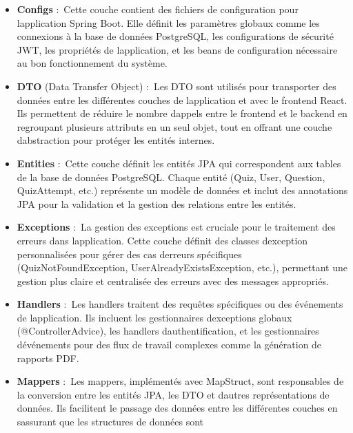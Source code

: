 \documentclass[12pt,a4paper,twoside]{report}
\begin{document}
\begin{itemize}
\item
  \textbf{Configs} :~Cette couche contient des fichiers de configuration
  pour l\textquotesingle application Spring Boot. Elle définit les
  paramètres globaux comme les connexions à la base de données
  PostgreSQL, les configurations de sécurité JWT, les propriétés de
  l\textquotesingle application, et les beans de configuration
  nécessaire au bon fonctionnement du système.
\item
  \textbf{DTO} (Data Transfer Object) :~Les DTO sont utilisés pour
  transporter des données entre les différentes couches de
  l\textquotesingle application et avec le frontend React. Ils
  permettent de réduire le nombre d\textquotesingle appels entre le
  frontend et le backend en regroupant plusieurs attributs en un seul
  objet, tout en offrant une couche d\textquotesingle abstraction pour
  protéger les entités internes.
\item
  \textbf{Entities} :~Cette couche définit les entités JPA qui
  correspondent aux tables de la base de données PostgreSQL. Chaque
  entité (Quiz, User, Question, QuizAttempt, etc.) représente un modèle
  de données et inclut des annotations JPA pour la validation et la
  gestion des relations entre les entités.
\item
  \textbf{Exceptions} :~La gestion des exceptions est cruciale pour le
  traitement des erreurs dans l\textquotesingle application. Cette
  couche définit des classes d\textquotesingle exception personnalisées
  pour gérer des cas d\textquotesingle erreurs spécifiques
  (QuizNotFoundException, UserAlreadyExistsException, etc.), permettant
  une gestion plus claire et centralisée des erreurs avec des messages
  appropriés.
\item
  \textbf{Handlers} :~Les handlers traitent des requêtes spécifiques ou
  des événements de l\textquotesingle application. Ils incluent les
  gestionnaires d\textquotesingle exceptions globaux
  (@ControllerAdvice), les handlers d\textquotesingle authentification,
  et les gestionnaires d\textquotesingle événements pour des flux de
  travail complexes comme la génération de rapports PDF.
\item
  \textbf{Mappers} :~Les mappers, implémentés avec MapStruct, sont
  responsables de la conversion entre les entités JPA, les DTO et
  d\textquotesingle autres représentations de données. Ils facilitent le
  passage des données entre les différentes couches en
  s\textquotesingle assurant que les structures de données sont

\end{itemize}
\end{document}
